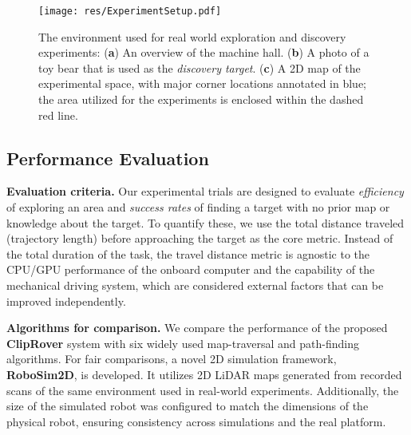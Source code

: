 
\begin{figure}
  \centering
  \texttt{[image: res/ExperimentSetup.pdf]}%
  \vspace{-1mm}
  \caption{The environment used for real world exploration and discovery experiments: (\textbf{a}) An overview of the machine hall. (\textbf{b}) A photo of a toy bear that is used as the \textit{discovery target}. (\textbf{c}) A 2D map of the experimental space, with major corner locations annotated in blue; the area utilized for the experiments is enclosed within the dashed red line.
  }
  \label{fig:env}
  \vspace{-2mm}
\end{figure}

\subsection{Performance Evaluation}
\noindent 
\textbf{Evaluation criteria.} Our experimental trials are designed to evaluate \textit{efficiency} of exploring an area and \textit{success rates} of finding a target with no prior map or knowledge about the target. To quantify these, we use the total distance traveled (trajectory length) before approaching the target as the core metric. Instead of the total duration of the task, the travel distance metric is agnostic to the CPU/GPU performance of the onboard computer and the capability of the mechanical driving system, which are considered external factors that can be improved independently.




\vspace{1mm}
\noindent 
\textbf{Algorithms for comparison.} We compare the performance of the proposed \textbf{ClipRover} system with six widely used map-traversal and path-finding algorithms. For fair comparisons, a novel 2D simulation framework, \textbf{RoboSim2D}, is developed. It utilizes 2D LiDAR maps generated from recorded scans of the same environment used in real-world experiments. Additionally, the size of the simulated robot was configured to match the dimensions of the physical robot, ensuring consistency across simulations and the real platform. 



